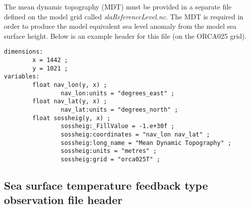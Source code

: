\documentclass[NEMO_book]{subfiles}
\begin{document}
The mean dynamic
topography (MDT) must be provided in a separate file defined on the model grid
 called {\it slaReferenceLevel.nc}. The MDT is required in
order to produce the model equivalent sea level anomaly from the model sea
surface height. Below is an example header for this file (on the ORCA025 grid).

\begin{alltt}
\tiny
\begin{verbatim}
dimensions:
        x = 1442 ;
        y = 1021 ;
variables:
        float nav_lon(y, x) ;
                nav_lon:units = "degrees_east" ;
        float nav_lat(y, x) ;
                nav_lat:units = "degrees_north" ;
        float sossheig(y, x) ;
                sossheig:_FillValue = -1.e+30f ;
                sossheig:coordinates = "nav_lon nav_lat" ;
                sossheig:long_name = "Mean Dynamic Topography" ;
                sossheig:units = "metres" ;
                sossheig:grid = "orca025T" ;
\end{verbatim}
\end{alltt}

\subsection{Sea surface temperature feedback type observation file header}
\end{document}
